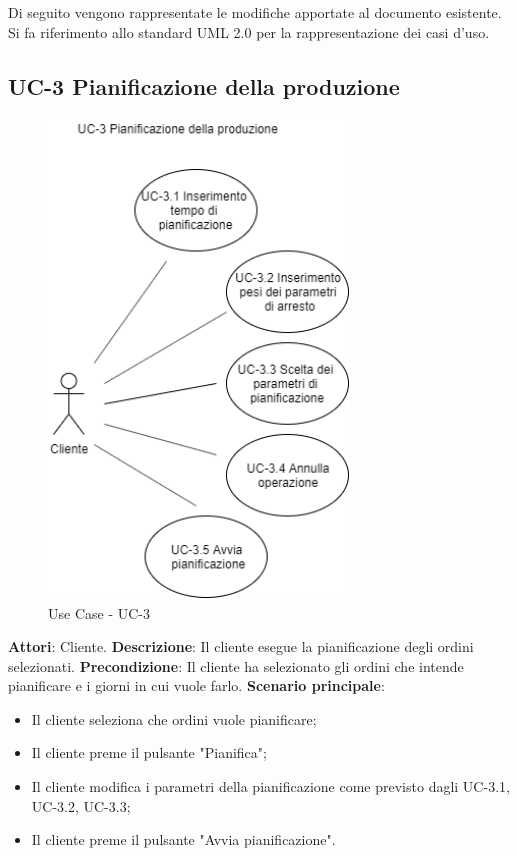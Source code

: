 Di seguito vengono rappresentate le modifiche apportate al documento esistente.
Si fa riferimento allo standard UML 2.0 per la rappresentazione dei casi d'uso.

\subsection*{UC-3 Pianificazione della produzione}

\begin{figure}[H]
	\includegraphics[width=8cm]{immagini/UC1.png}
	\centering
	\caption{Use Case - UC-3}
\end{figure}

\textbf{Attori}: Cliente. \newline
\textbf{Descrizione}: Il cliente esegue la pianificazione degli ordini selezionati.\newline
\textbf{Precondizione}: Il cliente ha selezionato gli ordini che intende pianificare e i giorni in cui vuole farlo.\newline
\textbf{Scenario principale}: \begin{itemize}
    \item Il cliente seleziona che ordini vuole pianificare;
    \item Il cliente preme il pulsante "Pianifica";
    \item Il cliente modifica i parametri della pianificazione come previsto dagli UC-3.1, UC-3.2, UC-3.3;
    \item Il cliente preme il pulsante "Avvia pianificazione".
\end{itemize}

